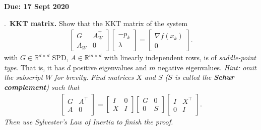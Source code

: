 \documentclass{letter}
\newcounter{problem}
\newcommand{\Problem}[2]{%
	\stepcounter{problem}%
	\leftskip=0pt%
	\theproblem.~\textbf{{#1.}} #2 \par%
}
\newcommand{\Due}[1]{\textbf{Due: #1} \par}
\newcommand{\T}{\intercal}
\begin{document}
    \Due{17 Sept 2020}
    \Problem{KKT matrix}{Show that the KKT matrix of the system \begin{align*}
        \begin{bmatrix} G & A^\T_W \\ A_W & 0 \end{bmatrix} \begin{bmatrix} -p_k \\ \lambda \end{bmatrix} = \begin{bmatrix} \nabla f(x_k) \\ 0 \end{bmatrix}.
    \end{align*} with $G \in \mathbb{R}^{d \times d}$ SPD, $A \in \mathbb{R}^{m \times d}$ with linearly independent rows, is of \emph{saddle-point type}. That is, it has $d$ positive eigenvalues and $m$ negative eigenvalues. \emph{Hint: omit the subscript $W$ for brevity. Find matrices $X$ and $S$ ($S$ is called the \textbf{Schur complement}) such that \begin{align*}
        \begin{bmatrix} G & A^\T \\ A & 0 \end{bmatrix} = \begin{bmatrix} I & 0 \\ X & I \end{bmatrix} \begin{bmatrix} G & 0 \\ 0 & S \end{bmatrix} \begin{bmatrix} I & X^\T \\ 0 & I \end{bmatrix}.
    \end{align*} Then use Sylvester's Law of Inertia to finish the proof.}}
\end{document}
